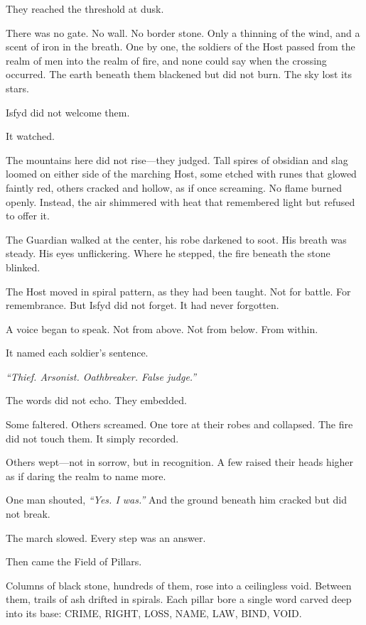 \documentclass[12pt]{article}
\begin{document}
They reached the threshold at dusk.

There was no gate. No wall. No border stone. Only a thinning of the wind, and a scent of iron in the breath. One by one, the soldiers of the Host passed from the realm of men into the realm of fire, and none could say when the crossing occurred. The earth beneath them blackened but did not burn. The sky lost its stars.

Isfyd did not welcome them.

It watched.

The mountains here did not rise—they judged. Tall spires of obsidian and slag loomed on either side of the marching Host, some etched with runes that glowed faintly red, others cracked and hollow, as if once screaming. No flame burned openly. Instead, the air shimmered with heat that remembered light but refused to offer it.

The Guardian walked at the center, his robe darkened to soot. His breath was steady. His eyes unflickering. Where he stepped, the fire beneath the stone blinked.

The Host moved in spiral pattern, as they had been taught. Not for battle. For remembrance. But Isfyd did not forget. It had never forgotten.

A voice began to speak. Not from above. Not from below. From within.

It named each soldier’s sentence.

\textit{``Thief. Arsonist. Oathbreaker. False judge.''}

The words did not echo. They embedded.

Some faltered. Others screamed. One tore at their robes and collapsed. The fire did not touch them. It simply recorded.

Others wept—not in sorrow, but in recognition. A few raised their heads higher as if daring the realm to name more.

One man shouted, \textit{``Yes. I was.''} And the ground beneath him cracked but did not break.

The march slowed. Every step was an answer.

Then came the Field of Pillars.

Columns of black stone, hundreds of them, rose into a ceilingless void. Between them, trails of ash drifted in spirals. Each pillar bore a single word carved deep into its base: \textsc{CRIME}, \textsc{RIGHT}, \textsc{LOSS}, \textsc{NAME}, \textsc{LAW}, \textsc{BIND}, \textsc{VOID}.
\end{document}
